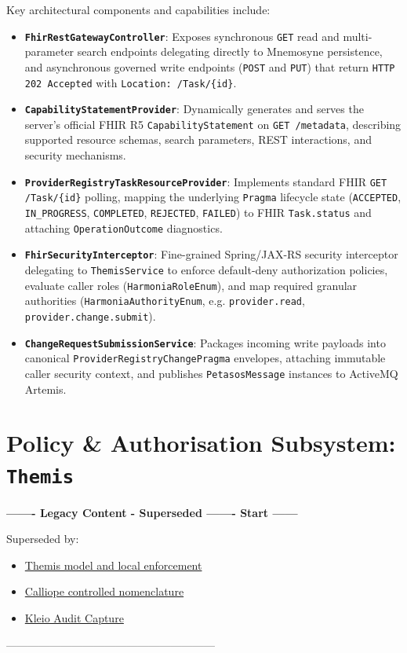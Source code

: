 Key architectural components and capabilities include:
\begin{itemize}
    \item \textbf{\texttt{FhirRestGatewayController}}: Exposes synchronous \texttt{GET} read and multi-parameter search endpoints delegating directly to Mnemosyne persistence, and asynchronous governed write endpoints (\texttt{POST} and \texttt{PUT}) that return \texttt{HTTP 202 Accepted} with \texttt{Location: /Task/\{id\}}.
    \item \textbf{\texttt{CapabilityStatementProvider}}: Dynamically generates and serves the server's official FHIR R5 \texttt{CapabilityStatement} on \texttt{GET /metadata}, describing supported resource schemas, search parameters, REST interactions, and security mechanisms.
    \item \textbf{\texttt{ProviderRegistryTaskResourceProvider}}: Implements standard FHIR \texttt{GET /Task/\{id\}} polling, mapping the underlying \texttt{Pragma} lifecycle state (\texttt{ACCEPTED}, \texttt{IN\_PROGRESS}, \texttt{COMPLETED}, \texttt{REJECTED}, \texttt{FAILED}) to FHIR \texttt{Task.status} and attaching \texttt{OperationOutcome} diagnostics.
    \item \textbf{\texttt{FhirSecurityInterceptor}}: Fine-grained Spring/JAX-RS security interceptor delegating to \texttt{ThemisService} to enforce default-deny authorization policies, evaluate caller roles (\texttt{HarmoniaRoleEnum}), and map required granular authorities (\texttt{HarmoniaAuthorityEnum}, e.g. \texttt{provider.read}, \texttt{provider.change.submit}).
    \item \textbf{\texttt{ChangeRequestSubmissionService}}: Packages incoming write payloads into canonical \texttt{ProviderRegistryChangePragma} envelopes, attaching immutable caller security context, and publishes \texttt{PetasosMessage} instances to ActiveMQ Artemis.
\end{itemize}

\section{Policy \& Authorisation Subsystem: \texttt{Themis}}
\label{sec:themis_subsystem}

\par\noindent\textbf{------- Legacy Content - Superseded ------- Start ------}
\par\noindent Superseded by:
\begin{itemize}
  \item \href{../../markdown/05-information-systems-architecture/component-register.md\#c02}{Themis model and local enforcement}
  \item \href{../../markdown/05-information-systems-architecture/component-register.md\#authorisation-nomenclature}{Calliope controlled nomenclature}
  \item \href{../../markdown/05-information-systems-architecture/component-register.md\#c03}{Kleio Audit Capture}
\end{itemize}
\noindent ---------------------------------------------------------

